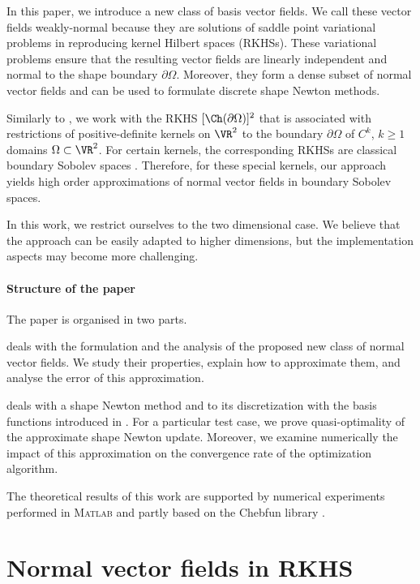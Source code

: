 \documentclass{siamart1116}
\numberwithin{theorem}{section}
\begin{document}
 
In this paper, we introduce a new class of basis vector fields.
We call these vector fields weakly-normal because they are solutions
of saddle point variational problems in reproducing kernel Hilbert spaces (RKHSs). 
These variational problems ensure that the resulting vector fields are linearly independent and
normal to the shape boundary $\partial \Omega$. Moreover, they form a dense subset of normal vector fields
and can be used to formulate discrete shape Newton methods.

Similarly to \cite{FUWR12}, we work with the RKHS $[\Ch(\partial \Omega)]^2$ that is associated with restrictions of positive-definite kernels on $\VR^2$ to the boundary $\partial \Omega$  of $C^k$, $k\ge 1$ domains $\Omega \subset\VR^2$. 
For certain kernels, the corresponding RKHSs are classical boundary Sobolev spaces
\cite[Sec. 10]{Wendlandbook}. Therefore, for these special kernels,
our approach yields high order approximations of normal vector fields in boundary Sobolev spaces. 

In this work, we restrict ourselves to the two dimensional case. We believe that the approach
can be easily adapted to higher dimensions, but the implementation aspects may become more
challenging.
  

\paragraph{Structure of the paper}
The paper is organised in two parts.

 deals with the formulation and the analysis of the proposed
new class of normal vector fields.
We study their properties, explain how to approximate them, and analyse the error of this approximation.

 deals with a shape Newton method and to its discretization with the basis functions
introduced in . For a particular test case, we prove quasi-optimality of the approximate
shape Newton update. Moreover, we examine numerically the impact of this approximation on the
convergence rate of the optimization algorithm.

The theoretical results of this work are supported by numerical experiments performed in \textsc{Matlab}
and partly based on the Chebfun library \cite{chebfun}.

\section{Normal vector fields in RKHS}\label{sec:normalVFs}
\end{document}
